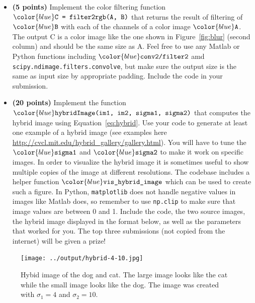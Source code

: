 \documentclass[10pt,letterpaper]{article}
\newcommand{\cmd}[1] {{\color{blue}\texttt{#1}}}
\begin{document}
\begin{itemize}
\item \textbf{(5 points)} Implement the color filtering function $\cmd{C = filter2rgb(A, B)}$ that returns the result of filtering of $\cmd{B}$ with each of the channels of a color image $\cmd{A}$. The output C is a color image like the one shown in Figure~\ref{fig:blur} (second column) and should be the same size as A. Feel free to use any Matlab or Python functions including $\cmd{conv2/filter2}$ amd \cmd{scipy.ndimage.filters.convolve}, but make sure the output size is the same as input size by appropriate padding. Include the code in your submission.

\item \textbf{(20 points)} Implement the function 
$\cmd{hybridImage(im1, im2, sigma1, sigma2)}$ that computes the hybrid image using Equation~\ref{eq:hybrid}. Use your code to generate at least one example of a hybrid image (see examples here \url{http://cvcl.mit.edu/hybrid_gallery/gallery.html}). You will have to tune the $\cmd{sigma1}$ and $\cmd{sigma2}$ to make it work on specific images. In order to visualize the hybrid image it is sometimes useful to show multiple copies of the image at different resolutions. The codebase includes a helper function $\cmd{vis\_hybrid\_image}$ which can be used to create such a figure.
In Python, \cmd{matplotlib} does not handle negative values in images like Matlab does, so remember to use \cmd{np.clip} to make sure that image values are between 0 and 1.
Include the code, the two source images, the hybrid image displayed in the format below, as well as the parameters that worked for you. The top three submissions (not copied from the internet) will be given a prize!

\end{itemize}
\begin{figure}[h]
\texttt{[image: ../output/hybrid-4-10.jpg]}
\caption{Hybid image of the dog and cat. The large image looks like the cat while the small image looks like the dog. The image was created with $\sigma_1 = 4$ and $\sigma_2 = 10$.}
\end{figure}
\end{document}
